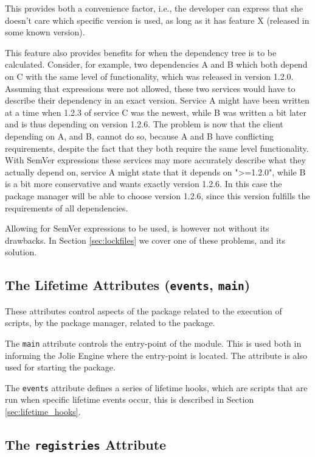 This provides both a convenience factor, i.e., the developer can express that
she doesn't care which specific version is used, as long as it has feature X
(released in some known version).

This feature also provides benefits for when the dependency tree is to be
calculated. Consider, for example, two dependencies A and B which both depend
on C with the same level of functionality, which was released in version 1.2.0.
Assuming that expressions were not allowed, these two services would have to
describe their dependency in an exact version. Service A might have been
written at a time when 1.2.3 of service C was the newest, while B was written a
bit later and is thus depending on version 1.2.6. The problem is now that the
client depending on A, and B, cannot do so, because A and B have conflicting
requirements, despite the fact that they both require the same level
functionality. With SemVer expressions these services may more accurately
describe what they actually depend on, service A might state that it depends on
">=1.2.0", while B is a bit more conservative and wants exactly version 1.2.6.
In this case the package manager will be able to choose version 1.2.6, since
this version fulfills the requirements of all dependencies.

Allowing for SemVer expressions to be used, is however not without its
drawbacks. In Section \ref{sec:lockfiles} we cover one of these problems, and
its solution.

\subsection{The Lifetime Attributes ({\tt events}, {\tt main})}

These attributes control aspects of the package related to the execution of
scripts, by the package manager, related to the package.

The \texttt{main} attribute controls the entry-point of the module.
This is used both in informing the Jolie Engine where the entry-point is
located. The attribute is also used for starting the package.

The \texttt{events} attribute defines a series of lifetime hooks,
which are scripts that are run when specific lifetime events occur, this is
described in Section \ref{sec:lifetime_hooks}.

\subsection{The {\tt registries} Attribute}

